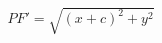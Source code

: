 \documentclass[preview]{standalone}
\begin{document}
\begin{align*}
PF' = \sqrt{(x+c)^2+y^2}
\end{align*}
\end{document}
